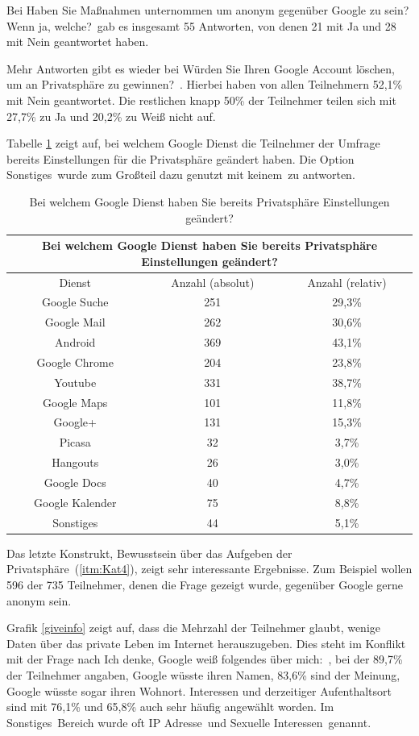 Bei \glqq Haben Sie Maßnahmen unternommen um anonym gegenüber Google zu sein? Wenn ja, welche?\grqq\ gab es insgesamt 55 Antworten, von denen 21 mit Ja und 28 mit Nein geantwortet haben. 

Mehr Antworten gibt es wieder bei \glqq Würden Sie Ihren Google Account löschen, um an Privatsphäre zu gewinnen?\grqq\ . Hierbei haben von allen Teilnehmern 52,1\% mit Nein geantwortet. Die restlichen knapp 50\% der Teilnehmer teilen sich mit 27,7\% zu Ja und 20,2\% zu Weiß nicht auf.

Tabelle \ref{changedprivacy} zeigt auf, bei welchem Google Dienst die Teilnehmer der Umfrage bereits Einstellungen für die Privatsphäre geändert haben. Die Option \glqq Sonstiges\grqq\ wurde zum Großteil dazu genutzt mit \glqq keinem\grqq\ zu antworten.
\begin{table}
	\begin{tabular}[]{ c || c | c }
	\multicolumn{3}{c}{Bei welchem Google Dienst haben Sie bereits Privatsphäre Einstellungen geändert?}\\\hline
	Dienst & Anzahl (absolut) & Anzahl (relativ)\\\hline\hline
	Google Suche & 251 & 29,3\%\\
	Google Mail & 262 & 30,6\%\\
	Android & 369 & 43,1\%\\
	Google Chrome & 204 & 23,8\%\\
	Youtube & 331 & 38,7\%\\
	Google Maps & 101 & 11,8\%\\
	Google+ & 131 & 15,3\%\\
	Picasa & 32 & 3,7\%\\
	Hangouts & 26 & 3,0\%\\
	Google Docs & 40 & 4,7\%\\
	Google Kalender & 75 & 8,8\%\\
	Sonstiges & 44 & 5,1\%\\
	\end{tabular}
	\caption{Bei welchem Google Dienst haben Sie bereits Privatsphäre Einstellungen geändert?}\label{changedprivacy}
\end{table}

Das letzte Konstrukt, \glqq Bewusstsein über das Aufgeben der Privatsphäre\grqq\ (\ref{itm:Kat4}), zeigt sehr interessante Ergebnisse. Zum Beispiel wollen 596 der 735 Teilnehmer, denen die Frage gezeigt wurde, gegenüber Google gerne anonym sein.

Grafik \ref{giveinfo} zeigt auf, dass die Mehrzahl der Teilnehmer glaubt, wenige Daten über das private Leben im Internet herauszugeben. Dies steht im Konflikt mit der Frage nach \glqq Ich denke, Google weiß folgendes über mich:\grqq\ , bei der 89,7\% der Teilnehmer angaben, Google wüsste ihren Namen, 83,6\% sind der Meinung, Google wüsste sogar ihren Wohnort. Interessen und derzeitiger Aufenthaltsort sind mit 76,1\% und 65,8\% auch sehr häufig angewählt worden. Im \glqq Sonstiges\grqq\ Bereich wurde oft \glqq IP Adresse\grqq\ und \glqq Sexuelle Interessen\grqq\ genannt.

